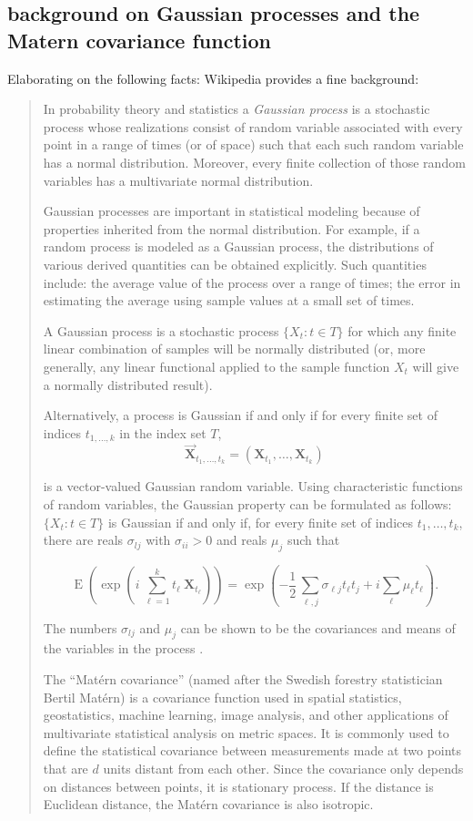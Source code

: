 \subsection{background on Gaussian processes and the Matern covariance
function}
Elaborating on the following facts: Wikipedia provides a fine background:
\begin{quote}
In probability theory and statistics a \emph{Gaussian process} is a
  stochastic process whose realizations consist of random variable
  associated with every point in a range of times (or of space) such
  that each such random variable has a normal distribution. Moreover,
  every finite collection of those random variables has a multivariate
  normal distribution.

Gaussian processes are important in statistical modeling because
of properties inherited from the normal distribution. For example, if
a random process is modeled as a Gaussian process, the distributions
of various derived quantities can be obtained explicitly. Such
quantities include: the average value of the process over a range of
times; the error in estimating the average using sample values at a
small set of times.

A Gaussian process is a stochastic process $\{X_t : t \in T\}$ for
which any finite linear combination of samples will be normally
distributed (or, more generally, any linear functional applied to the
sample function $X_t$ will give a normally distributed result).

Alternatively, a process is Gaussian if and only if for every finite
set of indices $t_{1,\ldots,k}$ in the index set $T$,
\[
 \vec{\mathbf{X}}_{t_1, \ldots, t_k} = (\mathbf{X}_{t_1}, \ldots, \mathbf{X}_{t_k})
\]

is a vector-valued Gaussian
random variable. Using characteristic functions of random variables, the
Gaussian property can be formulated as
follows: $\{X_t : t \in T\}$
is Gaussian if and only if, for every finite set of indices
$t_1, \ldots, t_k$, there are reals
$\sigma_{l j}$ with $\sigma_{ii} > 0$ and reals
$\mu_j$ such that

\[
\operatorname{E}\left(\exp\left(i \ \sum_{\ell=1}^k t_\ell
\ \mathbf{X}_{t_\ell}\right)\right) = \exp \left(-\frac{1}{2} \,
\sum_{\ell, j} \sigma_{\ell j} t_\ell t_j + i \sum_\ell \mu_\ell
t_\ell\right).
\]

The numbers $\sigma_{lj}$ and $\mu_j$ can be shown to be the
covariances and means of the variables in
the process \cite{WP:GP}.

The ``Mat\'{e}rn covariance'' (named after the Swedish forestry
statistician Bertil Mat\'{e}rn) is a covariance function used in
spatial statistics, geostatistics, machine learning, image analysis,
and other applications of multivariate statistical analysis on metric
spaces. It is commonly used to define the statistical covariance
between measurements made at two points that are $d$ units distant
from each other. Since the covariance only depends on distances
between points, it is stationary process. If the distance is Euclidean
distance, the Mat\'{e}rn covariance is also isotropic.


\end{quote}
